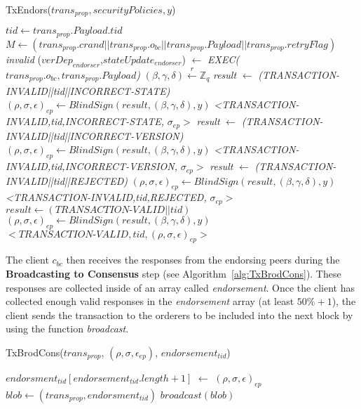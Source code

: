 \documentclass[conference]{llncs}
\begin{document}
\begin{algorithm}[ht]
\caption{TxEndors($trans_{prop},securityPolicies,y$)}
\label{alg:TxEndors}
\begin{algorithmic}[1]
\STATE $tid \gets trans_{prop}.Payload.tid$
\STATE $M \gets (trans_{prop}.crand\vert\vert trans_{prop}.o_{bc} \vert\vert trans_{prop}.Payload \vert\vert trans_{prop}.retryFlag)$
  \RETURN \emph{invalid} \ELSE
\STATE ($verDep_{endorser}$,$stateUpdate_{endorser}$) $\gets$  \emph{EXEC(}$trans_{prop}.o_{bc},trans_{prop}.Payload$\emph{)} \ENDIF
\STATE $(\beta,\gamma,\delta)\xleftarrow[]{r}\mathbb{Z}_q$  
\STATE \emph{result} $\gets$ \emph{(\textit{TRANSACTION-INVALID}||tid||\textit{INCORRECT-STATE})}
\STATE $(\rho,\sigma,\epsilon)_{ep} \gets BlindSign(result,(\beta,\gamma,\delta),y)$
\RETURN \emph{<\textit{TRANSACTION-INVALID},tid,\textit{INCORRECT-STATE},} $\sigma_{ep}>$ 
\STATE \emph{result} $\gets$ \emph{(\textit{TRANSACTION-INVALID}||tid||\textit{INCORRECT-VERSION})}
\STATE $(\rho,\sigma,\epsilon)_{ep} \gets BlindSign(result,(\beta,\gamma,\delta),y)$
\RETURN \emph{<\textit{TRANSACTION-INVALID},tid,\textit{INCORRECT-VERSION},} $\sigma_{ep}>$ 
\STATE \emph{result} $\gets$ \emph{(\textit{TRANSACTION-INVALID}||tid||\textit{REJECTED})}
\STATE $(\rho,\sigma,\epsilon)_{ep} \gets BlindSign(result,(\beta,\gamma,\delta),y)$
\RETURN \emph{<\textit{TRANSACTION-INVALID},tid,\textit{REJECTED},} $\sigma_{ep}>$
\ELSE  
\STATE $result \gets (\textit{TRANSACTION-VALID}||tid)$
\STATE $(\rho,\sigma,\epsilon)_{ep} \gets BlindSign(result,(\beta,\gamma,\delta),y)$
\RETURN $<\textit{TRANSACTION-VALID},tid,(\rho,\sigma,\epsilon)_{ep}>$
\ENDIF
\end{algorithmic}
\end{algorithm}

The client $c_{bc}$ then receives the responses from the endorsing peers during the \textbf{Broadcasting to Consensus} step (see Algorithm~\ref{alg:TxBrodCons}). These responses are collected inside of an array called \textit{endorsement}. Once the client has collected enough valid responses in the \textit{endorsement} array (at least $50\%+1$), the client sends the transaction to the orderers to be included into the next block by using the function \textit{broadcast}. 

\begin{algorithm}[ht]
\caption{TxBrodCons($trans_{prop}$, $(\rho,\sigma,\epsilon_{ep})$, $endorsement_{tid}$)}
\label{alg:TxBrodCons}
\begin{algorithmic}[1]
\STATE $endorsment_{tid}[endorsement_{tid}.length+1]$ $\gets$ $(\rho,\sigma,\epsilon)_{ep}$
\STATE $blob \gets (trans_{prop},endorsment_{tid})$
\RETURN $broadcast(blob)$
\ENDIF
\end{algorithmic}
\end{algorithm}
\end{document}
